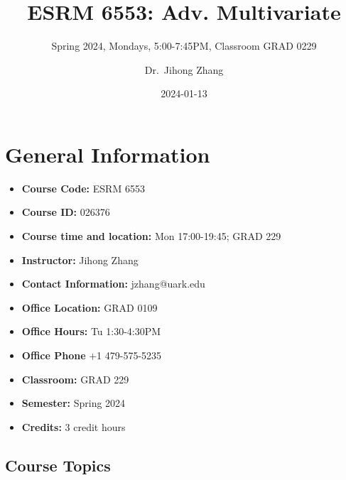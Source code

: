 \documentclass[
  letterpaper,
  DIV=11,
  numbers=noendperiod]{scrartcl}
\title{ESRM 6553: Adv. Multivariate}
\subtitle{Spring 2024, Mondays, 5:00-7:45PM, Classroom GRAD 0229}
\author{Dr.~Jihong Zhang}
\date{2024-01-13}
\makeatletter
\providecommand{\tightlist}{%
  \setlength{\itemsep}{0pt}\setlength{\parskip}{0pt}}\usepackage{longtable,booktabs,array}
\renewcommand{\maketitle}{\bgroup\setlength{\parindent}{0pt}
\begin{flushleft}
  {\sffamily\huge\textbf{\MakeUppercase{\@title}}} \vspace{0.3cm} \newline
  {\Large {\@subtitle}} \newline
  \@author
\end{flushleft}\egroup
}
\makeatother
\begin{document}
\maketitle
\pagestyle{mystyle}

\ifdefined\Shaded\renewenvironment{Shaded}{\begin{tcolorbox}[boxrule=0pt, borderline west={3pt}{0pt}{shadecolor}, frame hidden, colback={codebgcolor}, enhanced, breakable, sharp corners]}{\end{tcolorbox}}\fi

\hypertarget{general-information}{%
\section{General Information}\label{general-information}}

\begin{itemize}
\tightlist
\item
  \textbf{Course Code:} ESRM 6553
\item
  \textbf{Course ID:} 026376
\item
  \textbf{Course time and location:} Mon 17:00-19:45; GRAD 229
\item
  \textbf{Instructor:} Jihong Zhang
\item
  \textbf{Contact Information:} jzhang@uark.edu
\item
  \textbf{Office Location:} GRAD 0109
\item
  \textbf{Office Hours:} Tu 1:30-4:30PM
\item
  \textbf{Office Phone} +1 479-575-5235
\item
  \textbf{Classroom:} GRAD 229
\item
  \textbf{Semester:} Spring 2024
\item
  \textbf{Credits:} 3 credit hours
\end{itemize}

\hypertarget{course-topics}{%
\subsection{Course Topics}\label{course-topics}}
\end{document}
